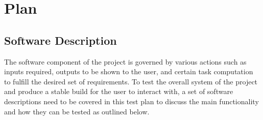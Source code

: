 \documentclass{article}
\begin{document}
\section{Plan}

\subsection{Software Description}

The software component of the project is governed by various actions such as inputs required, outputs to be shown to the user, and certain task computation to fulfill the desired set of requirements. To test the overall system of the project and produce a stable build for the user to interact with, a set of software descriptions need to be covered in this test plan to discuss the main functionality and how they can be tested as outlined below.
\end{document}
